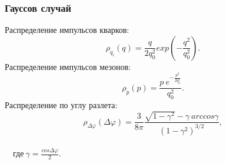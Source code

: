 \documentclass{beamer}
\renewcommand{\l}{\left( }
\renewcommand{\r}{\right) }
\renewcommand{\phi}{\varphi}
\newcommand{\br}[1]{\l {#1} \r}
\begin{document}
\begin{frame}[fragile]
\frametitle{Гауссов случай}
\begin{minipage}[h]{0.53\linewidth}
Распределение импульсов кварков:
$$\rho_{q_i} \br{q} = \frac{q}{2 q_0^2} exp \br{-\frac{q^2}{q_0^2} }.$$
$$$$
Распределение импульсов мезонов:
$$\rho_p \br{p} = \frac{p \ e^{-\frac{p^2}{2q_0^2}}}{q_0^2}.$$
Распределение по углу разлета: \\
$$\rho_{\Delta \phi} \br{\Delta \phi} = \frac{3}{8 \pi} \frac{\sqrt{1 - \gamma^2} - \gamma \ arccos \gamma}{\br{1 - \gamma^2}^{3/2}},$$ \\
$\quad \text{где} \ \gamma = \frac{cos \Delta \phi}{2}.$
\end{minipage}
\begin{minipage}[h]{0.43\linewidth}
\end{minipage}
\end{frame}
\end{document}
